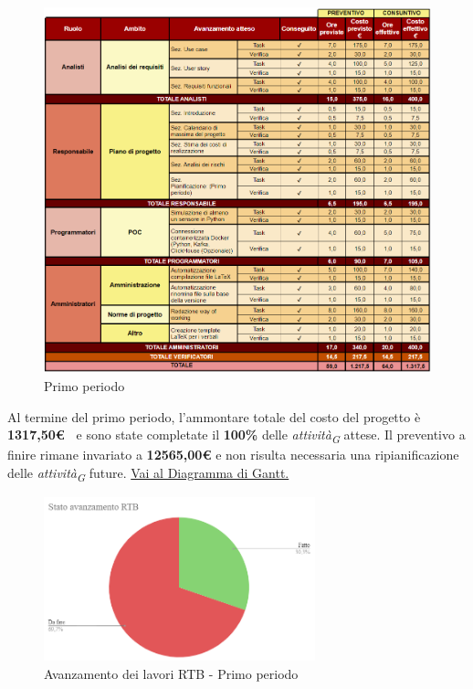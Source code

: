 \begin{figure}[H]
    \centering
    \includegraphics[height=0.9\textwidth]{../Images/periodo1.PNG}
    \caption{Primo periodo}
    \label{fig:Primo_periodo}
\end{figure}


Al termine del primo periodo, l'ammontare totale del costo del progetto è \textbf{ 1317,50\euro\ } e sono state completate il \textbf{100\%} delle \textit{attività}\textsubscript{\textit{G}} attese.
Il preventivo a finire rimane invariato a \textbf{12565,00€} e non risulta necessaria una ripianificazione delle \textit{attività}\textsubscript{\textit{G}} future.
\href{https://github.com/orgs/ByteOps-swe/projects/3/views/1?sortedBy%5Bdirection%5D=asc&sortedBy%5BcolumnId%5D=64182560}{Vai al Diagramma di Gantt.}

\pagebreak

\begin{figure}[H]
    \centering
    \begin{minipage}[b]{0.70\textwidth}
        \centering
        \includegraphics[width=0.7\textwidth]{../Images/avanzamento1Periodo.png}
        \caption{Avanzamento dei lavori RTB - Primo periodo}
        \label{fig:Avanzamento_RTB_1}
    \end{minipage}
\end{figure}

